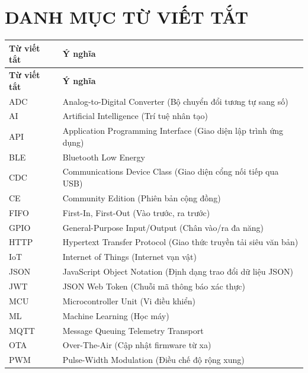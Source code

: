 
\section*{DANH MỤC TỪ VIẾT TẮT}

{\small
\renewcommand{\arraystretch}{1.22}
\begin{longtable}{|L{0.23\textwidth}|L{0.71\textwidth}|}
  \hline
  \textbf{Từ viết tắt} & \textbf{Ý nghĩa} \\
  \hline
  \endfirsthead
  \hline
  \textbf{Từ viết tắt} & \textbf{Ý nghĩa} \\
  \hline
  \endhead
  \hline
  \endfoot
  ADC    & Analog-to-Digital Converter (Bộ chuyển đổi tương tự sang số) \\
  \hline
  AI     & Artificial Intelligence (Trí tuệ nhân tạo) \\
  \hline
  API    & Application Programming Interface (Giao diện lập trình ứng dụng) \\
  \hline
  BLE    & Bluetooth Low Energy \\
  \hline
  CDC    & Communications Device Class (Giao diện cổng nối tiếp qua USB) \\
  \hline
  CE     & Community Edition (Phiên bản cộng đồng) \\
  \hline
  FIFO   & First-In, First-Out (Vào trước, ra trước) \\
  \hline
  GPIO   & General-Purpose Input/Output (Chân vào/ra đa năng) \\
  \hline
  HTTP   & Hypertext Transfer Protocol (Giao thức truyền tải siêu văn bản) \\
  \hline
  IoT    & Internet of Things (Internet vạn vật) \\
  \hline
  JSON   & JavaScript Object Notation (Định dạng trao đổi dữ liệu JSON) \\
  \hline
  JWT    & JSON Web Token (Chuỗi mã thông báo xác thực) \\
  \hline
  MCU    & Microcontroller Unit (Vi điều khiển) \\
  \hline
  ML     & Machine Learning (Học máy) \\
  \hline
  MQTT   & Message Queuing Telemetry Transport \\
  \hline
  OTA    & Over-The-Air (Cập nhật firmware từ xa) \\
  \hline
  PWM    & Pulse-Width Modulation (Điều chế độ rộng xung) \\

\end{longtable}}

